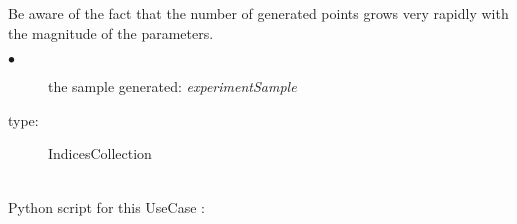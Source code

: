 Be aware of the fact that the number of generated points grows very rapidly with the magnitude of the parameters.\\

             {
               \begin{description}
               \item[$\bullet$] the sample generated: {\itshape experimentSample}
               \item[type:] IndicesCollection
               \end{description}
             }

             \textspace\\

             Python script for this UseCase :


